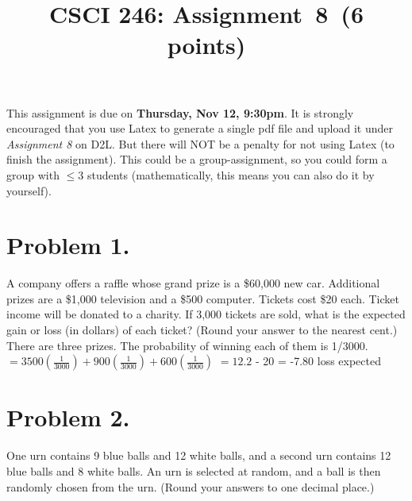 \documentclass[11pt]{article}
\begin{document}
\date{}

\title{CSCI 246: Assignment~8~(6 points)}


\maketitle


\noindent
This assignment is due on {\bf Thursday, Nov 12, 9:30pm}. It is strongly
encouraged that you use Latex to generate a single pdf file and upload it
under {\em Assignment 8} on D2L. But there will NOT be a penalty for not
using Latex (to finish the assignment). This could be a group-assignment,
so you could form a group with $\leq 3$ students (mathematically, this means
you can also do it by yourself).
\newline
 
\section*{Problem 1.}

\noindent
A company offers a raffle whose grand prize is a \$60,000 new car. Additional prizes are a \$1,000 television and a \$500 computer. Tickets cost \$20 each. Ticket income will be donated to a charity. If 3,000 tickets are sold, what is the expected gain or loss (in dollars) of each ticket? (Round your answer to the nearest cent.)
\newline
\newline
There are three prizes. The probability of winning each of them is 1/3000.
\newline
$= 3500(\frac{1}{3000}) + 900(\frac{1}{3000}) + 600(\frac{1}{3000})$
\newline
$= 12.2$ 
 - 20 = -7.80 loss expected
\newline


\newpage

\section*{Problem 2.}

\noindent
One urn contains {\color{red}9} blue balls and {\color{red}12} white balls, and a second urn contains {\color{red}12} blue balls and {\color{red}8} white balls. An urn is selected at random, and a ball is then randomly chosen from the
urn. (Round your answers to one decimal place.)
\newline
\end{document}
